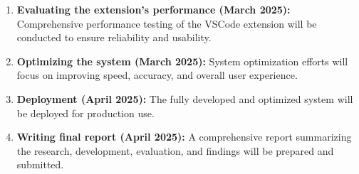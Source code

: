 \begin{enumerate}
    \item \textbf{Evaluating the extension's performance (March 2025):}
    Comprehensive performance testing of the VSCode extension will be conducted to ensure reliability and usability.

    \item \textbf{Optimizing the system (March 2025):}
    System optimization efforts will focus on improving speed, accuracy, and overall user experience.

    \item \textbf{Deployment (April 2025):}
    The fully developed and optimized system will be deployed for production use.

    \item \textbf{Writing final report (April 2025):}
    A comprehensive report summarizing the research, development, evaluation, and findings will be prepared and submitted.
\end{enumerate}
